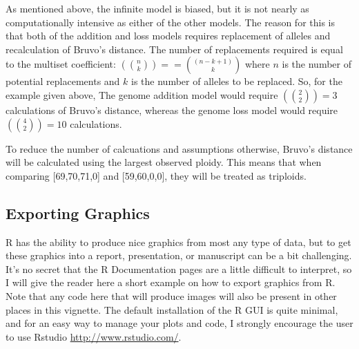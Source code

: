 \documentclass[letterpaper]{article}\usepackage[]{graphicx}\usepackage[]{color}
\newcommand{\tab}{\hspace*{1em}}
\begin{document}
As mentioned above, the infinite model is biased, but it is not nearly as computationally intensive as either of the other models. The reason for this is that both of the addition and loss models requires replacement of alleles and recalculation of Bruvo's distance. The number of replacements required is equal to the multiset coefficient: $\left({n \choose k}\right) == {(n-k+1) \choose k}$ where $n$ is the number of potential replacements and $k$ is the number of alleles to be replaced. So, for the example given above, The genome addition model would require $\left({2 \choose 2}\right) = 3$ calculations of Bruvo's distance, whereas the genome loss model would require $\left({4 \choose 2}\right) = 10$ calculations. 

To reduce the number of calcuations and assumptions otherwise, Bruvo's distance will be calculated using the largest observed ploidy. This means that when comparing [69,70,71,0] and [59,60,0,0], they will be treated as triploids.

%
\subsection{Exporting Graphics}
\label{appendix:graphics}
\tab\tab R has the ability to produce nice graphics from most any type of data, but to get these graphics into a report, presentation, or manuscript can be a bit challenging. It's no secret that the R Documentation pages are a little difficult to interpret, so I will give the reader here a short example on how to export graphics from R. Note that any code here that will produce images will also be present in other places in this vignette. The default installation of the R GUI is quite minimal, and for an easy way to manage your plots and code, I strongly encourage the user to use Rstudio \url{http://www.rstudio.com/}.
\end{document}

